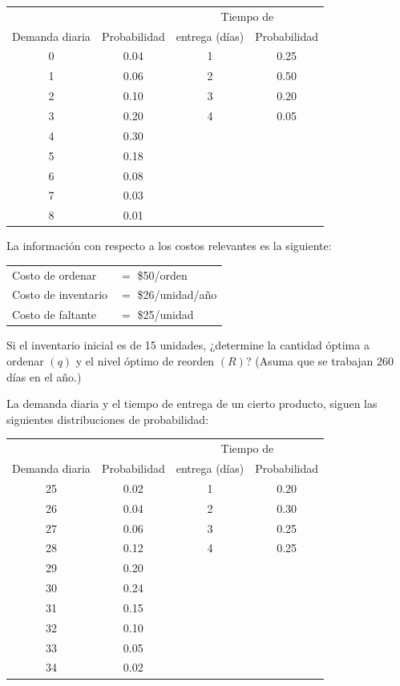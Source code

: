 \documentclass[11pt,letterpaper]{report}
\begin{document}
\begin{description}[leftmargin=1.2cm,style=nextline]
\begin{center}
\begin{tabular}{cc@{\hskip 1.5cm}cc}
\multicolumn{2}{c}{} & \multicolumn{2}{c}{Tiempo de} \\
Demanda diaria & Probabilidad & entrega (días) & Probabilidad \\
\midrule
0 & 0.04 & 1 & 0.25 \\
1 & 0.06 & 2 & 0.50 \\
2 & 0.10 & 3 & 0.20 \\
3 & 0.20 & 4 & 0.05 \\
4 & 0.30 &   &      \\
5 & 0.18 &   &      \\
6 & 0.08 &   &      \\
7 & 0.03 &   &      \\
8 & 0.01 &   &      \\
\end{tabular}
\end{center}

La información con respecto a los costos relevantes es la siguiente:
\begin{center}
\begin{tabular}{ll}
Costo de ordenar    & $=$ \$50/orden \\
Costo de inventario & $=$ \$26/unidad/año \\
Costo de faltante   & $=$ \$25/unidad \\
\end{tabular}
\end{center}

Si el inventario inicial es de 15 unidades, ¿determine la cantidad óptima a
ordenar $(q)$ y el nivel óptimo de reorden $(R)$? (Asuma que se trabajan 260
días en el año.)

\item[5.11.] La demanda diaria y el tiempo de entrega de un cierto producto,
siguen las siguientes distribuciones de probabilidad:

\begin{center}
\begin{tabular}{cc@{\hskip 1.5cm}cc}
\multicolumn{2}{c}{} & \multicolumn{2}{c}{Tiempo de} \\
Demanda diaria & Probabilidad & entrega (días) & Probabilidad \\
\midrule
25 & 0.02 & 1 & 0.20 \\
26 & 0.04 & 2 & 0.30 \\
27 & 0.06 & 3 & 0.25 \\
28 & 0.12 & 4 & 0.25 \\
29 & 0.20 &   &      \\
30 & 0.24 &   &      \\
31 & 0.15 &   &      \\
32 & 0.10 &   &      \\
33 & 0.05 &   &      \\
34 & 0.02 &   &      \\
\end{tabular}
\end{center}


\end{description}
\end{document}
